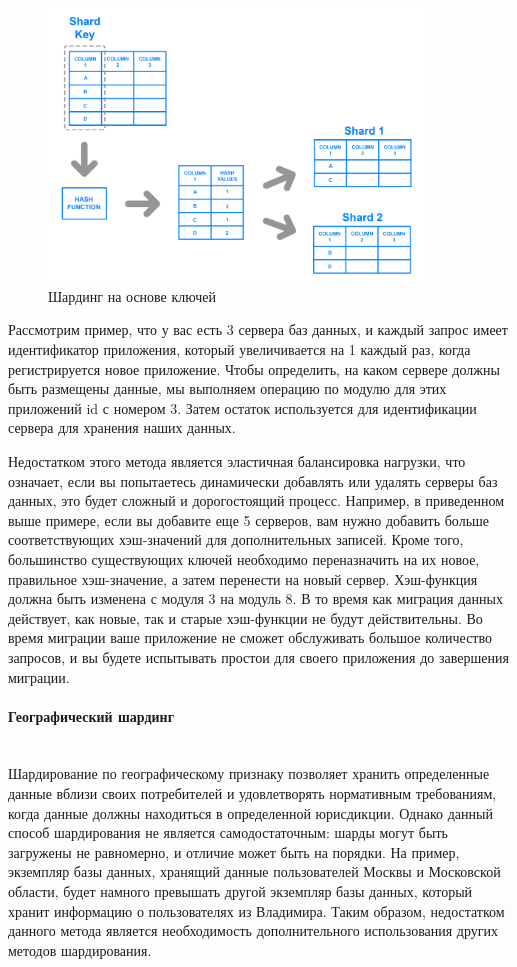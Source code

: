 \begin{figure}[H]
    \centering
    \includegraphics[width=100mm]{assets/distributed/Keybased-Sharding}
    \caption{Шардинг на основе ключей}
    \label{fig:Keybased-Sharding}
\end{figure}

Рассмотрим пример, что у вас есть 3 сервера баз данных, и каждый запрос имеет идентификатор приложения, который
увеличивается на 1 каждый раз, когда регистрируется новое приложение. Чтобы определить, на каком сервере должны быть
размещены данные, мы выполняем операцию по модулю для этих приложений id с номером 3. Затем остаток используется для
идентификации сервера для хранения наших данных.

Недостатком этого метода является эластичная балансировка нагрузки, что означает, если вы попытаетесь динамически
добавлять или удалять серверы баз данных, это будет сложный и дорогостоящий процесс. Например, в приведенном выше
примере, если вы добавите еще 5 серверов, вам нужно добавить больше соответствующих хэш-значений для дополнительных
записей. Кроме того, большинство существующих ключей необходимо переназначить на их новое, правильное хэш-значение,
а затем перенести на новый сервер. Хэш-функция должна быть изменена с модуля 3 на модуль 8. В то время как миграция
данных действует, как новые, так и старые хэш-функции не будут действительны. Во время миграции ваше приложение не
сможет обслуживать большое количество запросов, и вы будете испытывать простои для своего приложения до завершения
миграции. \autocite{DatabaseSharding}

\paragraph{Географический шардинг} ~\\
Шардирование по географическому признаку позволяет хранить определенные данные вблизи своих потребителей и
удовлетворять нормативным требованиям, когда данные должны находиться в определенной юрисдикции. Однако данный способ
шардирования не является самодостаточным: шарды могут быть загружены не равномерно, и отличие может быть на порядки.
На пример, экземпляр базы данных, хранящий данные пользователей Москвы и Московской области, будет намного превышать
другой экземпляр базы данных, который хранит информацию о пользователях из Владимира. Таким образом, недостатком
данного метода является необходимость дополнительного использования других методов шардирования.

